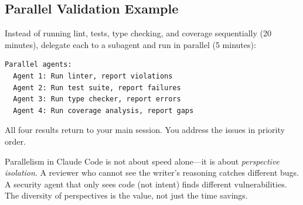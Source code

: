 \subsection{Parallel Validation Example}


Instead of running lint, tests, type checking, and coverage sequentially
(20 minutes), delegate each to a subagent and run in parallel (5 minutes):

\begin{verbatim}
Parallel agents:
  Agent 1: Run linter, report violations
  Agent 2: Run test suite, report failures
  Agent 3: Run type checker, report errors
  Agent 4: Run coverage analysis, report gaps
\end{verbatim}

All four results return to your main session.
You address the issues in priority order.

\begin{keyinsight}
Parallelism in Claude Code is not about speed alone---it is about
\emph{perspective isolation}. A reviewer who cannot see the writer's
reasoning catches different bugs. A security agent that only sees code
(not intent) finds different vulnerabilities. The diversity of perspectives
is the value, not just the time savings.
\end{keyinsight}
